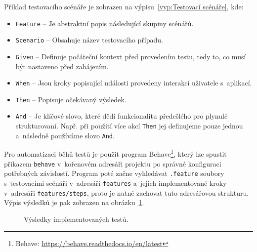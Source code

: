 Příklad testovacího scénáře je zobrazen na výpisu~\ref{vyp:Testovací scénáře}, kde:
\begin{itemize}
    \item \texttt{Feature} -- Je abstraktní popis následující skupiny scénářů.
    \item \texttt{Scenario} -- Obsahuje název testovacího případu.
    \item \texttt{Given} -- Definuje počáteční kontext před provedením testu, tedy to, co musí být nastaveno před zahájením.
    \item \texttt{When} -- Jsou kroky popisující události provedeny interakcí uživatele s~aplikací.
    \item \texttt{Then} -- Popisuje očekávaný výsledek.
    \item \texttt{And} -- Je klíčové slovo, které dědí funkcionalitu předešlého pro plynulé strukturovaní. Např. při použití více akcí \texttt{Then} jej definujeme pouze jednou a~následně používáme slovo \texttt{And}.
\end{itemize}
Pro automatizaci běhů testů je použit program Behave\footnote{Behave: \url{https://behave.readthedocs.io/en/latest}}, který lze spustit příkazem \texttt{behave} v~kořenovém adresáři projektu po správné konfiguraci potřebných závislostí. Program poté začne vyhledávat \texttt{.feature} soubory s~testovacími scénáři v~adresáři \texttt{features} a~jejich implementované kroky v~adresáři \texttt{features/steps}, proto je nutné zachovat tuto adresářovou strukturu. Výpis výsledků je pak zobrazen na obrázku~\ref{obr:Výsledky testů}.
\begin{figure}[hbt]
	\centering
	\setlength{\fboxsep}{0pt}
	\caption{Výsledky implementovaných testů.}
	\label{obr:Výsledky testů}
\end{figure}


